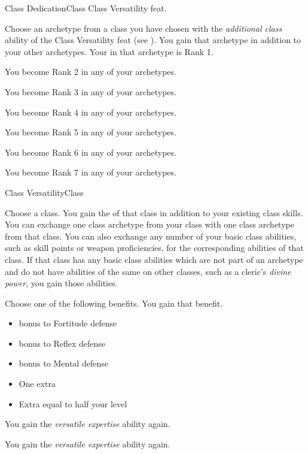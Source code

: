     \begin{feat}{Class Dedication}{Class}
        \featpre Class Versatility feat.

         Choose an archetype from a class you have chosen with the \textit{additional class} ability of the Class Versatility feat (see ).
        You gain that archetype in addition to your other archetypes.
        Your  in that archetype is Rank 1.

         You become Rank 2 in any of your archetypes.

         You become Rank 3 in any of your archetypes.

         You become Rank 4 in any of your archetypes.

         You become Rank 5 in any of your archetypes.

         You become Rank 6 in any of your archetypes.

         You become Rank 7 in any of your archetypes.
    \end{feat}

    \begin{feat}{Class Versatility}{Class}

         Choose a class.
        You gain the  of that class in addition to your existing class skills.
        You can exchange one class archetype from your class with one class archetype from that class.
        You can also exchange any number of your basic class abilities, such as skill points or weapon proficiencies, for the corresponding abilities of that class.
        If that class has any basic class abilities which are not part of an archetype and do not have abilities of the same on other classes, such as a cleric's \textit{divine power}, you gain those abilities.

         Choose one of the following benefits.
        You gain that benefit.
        \begin{itemize}
            \item {} bonus to Fortitude defense
            \item {} bonus to Reflex defense
            \item {} bonus to Mental defense
            \item One extra 
            \item Extra  equal to half your level
        \end{itemize}

         You gain the \textit{versatile expertise} ability again.

         You gain the \textit{versatile expertise} ability again.
    \end{feat}


